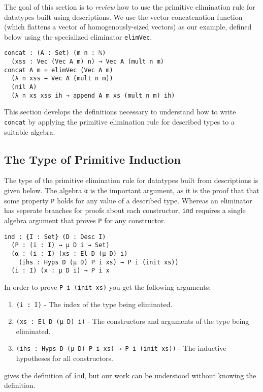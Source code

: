 \documentclass[preprint,nonatbib]{sigplanconf}
\begin{document}
The goal of this section is to {\it review} how to use the primitive
elimination rule for datatypes built using descriptions. We use
the vector concatenation function (which flattens a vector of
homogenously-sized vectors) as our example, defined below using the
specialized eliminator {\tt elimVec}.

\begin{verbatim}
concat : (A : Set) (m n : ℕ)
  (xss : Vec (Vec A m) n) → Vec A (mult n m)
concat A m = elimVec (Vec A m)
  (λ n xss → Vec A (mult n m))
  (nil A)
  (λ n xs xss ih → append A m xs (mult n m) ih)
\end{verbatim}

This section develops the definitions necessary to understand how to
write {\tt concat} by applying the primitive elimination rule for
described types to a suitable algebra.

\subsection{The Type of Primitive Induction}

The type of the primitive elimination rule for datatypes built from
descriptions is given below.
The algebra {\tt α} is the important argument, as it is the proof that
that some property {\tt P} holds for any value of a
described type.
Whereas an eliminator
has seperate branches for proofs about each constructor, {\tt ind}
requires a single algebra argument that proves {\tt P} for any
constructor.

\begin{verbatim}
ind : {I : Set} (D : Desc I)
  (P : (i : I) → μ D i → Set)
  (α : (i : I) (xs : El D (μ D) i)
    (ihs : Hyps D (μ D) P i xs) → P i (init xs))
  (i : I) (x : μ D i) → P i x
\end{verbatim}

In order to prove {\tt P i (init xs)} you get the following
arguments:

\begin{enumerate}
\item{{\tt (i : I)}} - The index of the type being eliminated.
\item{{\tt (xs : El D (μ D) i)}} - The constructors and arguments of the type
  being eliminated.
\item{{\tt (ihs : Hyps D (μ D) P i xs) → P i (init xs))}} - The inductive
  hypotheses for all constructors.
\end{enumerate}

\citet{mcbride2010ornamental} gives the definition of {\tt ind}, but
our work can be understood without knowing the definition.
\end{document}
